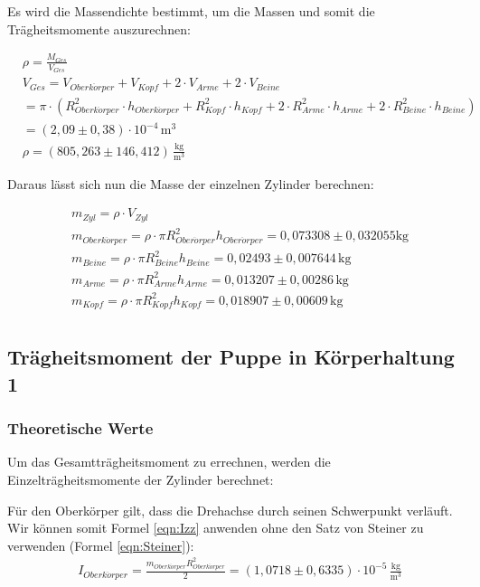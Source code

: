 Es wird die Massendichte bestimmt, um die Massen und somit die Trägheitsmomente auszurechnen:

\begin{align*}
& \rho = \frac{M_{Ges}}{V_{Ges}} \\
&  V_{Ges} = V_{Oberk\ddot{o}rper} + V_{Kopf} + 2 \cdot V_{Arme} + 2 \cdot V_{Beine} \\
&  = \pi \cdot \left(R_{Oberk\ddot{o}rper}^2  \cdot h_{Oberk\ddot{o}rper} + R_{Kopf}^2 \cdot h_{Kopf} + 2 \cdot R_{Arme}^2 \cdot h_{Arme} +2 \cdot R_{Beine}^2 \cdot h_{Beine} \right) \\
&  = (2{,}09 \pm 0{,}38) \cdot 10^{-4} \, \mathrm{m^3} \\
& \rho = (805{,}263 \pm 146{,}412) \, \mathrm{\frac{kg}{m^3}}
\end{align*}

Daraus lässt sich nun die Masse der einzelnen Zylinder berechnen:

\begin{align*}
  &  m_{Zyl} = \rho \cdot V_{Zyl} \\
  &  m_{Oberk\ddot{o}rper} = \rho \cdot \pi R_{Ober\ddot{o}rper}^2 h_{Ober\ddot{o}rper} = 0{,}073308 \pm 0{,}032055 \mathrm{kg} \\
  &  m_{Beine} = \rho \cdot \pi R_{Beine}^2 h_{Beine} = 0{,}02493 \pm 0{,}007644 \, \mathrm{kg} \\
  &  m_{Arme} = \rho \cdot \pi R_{Arme}^2 h_{Arme} = 0{,}013207 \pm 0{,}00286 \, \mathrm{kg} \\
  &  m_{Kopf} = \rho \cdot \pi R_{Kopf}^2 h_{Kopf} = 0{,}018907 \pm 0{,}00609 \, \mathrm{kg} \\
\end{align*}

\subsection{Trägheitsmoment der Puppe in Körperhaltung 1}
\label{sec:TraegheitsmomentderPuppeinKoerperhaltung 1}
\subsubsection{Theoretische Werte}

Um das Gesamtträgheitsmoment zu errechnen, werden die Einzelträgheitsmomente der Zylinder berechnet:

Für den Oberkörper gilt, dass die Drehachse durch seinen Schwerpunkt verläuft. Wir können somit Formel \ref{eqn:Izz} anwenden ohne den 
Satz von Steiner zu verwenden (Formel \ref{eqn:Steiner}):
\begin{align*}
  & I_{Oberk\ddot{o}rper} = \frac{m_{Oberk\ddot{o}rper}R_{Oberk\ddot{o}rper}^2}{2} = (1{,}0718 \pm 0{,}6335) \cdot 10^{-5} \, \mathrm{\frac{kg}{m^3}}
\end{align*}

